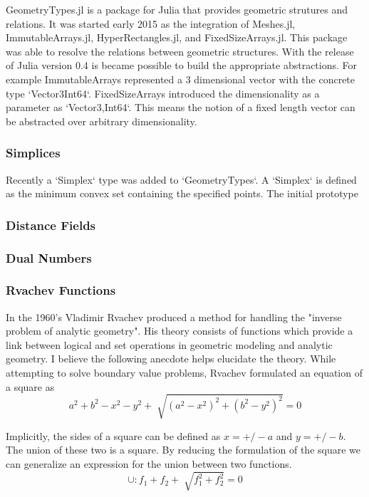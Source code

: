 \documentclass[a4paper]{article}
\begin{document}
GeometryTypes.jl is a package for Julia that provides geometric strutures and
relations. It was started early 2015 as the integration of Meshes.jl,
ImmutableArrays.jl, HyperRectangles.jl, and FixedSizeArrays.jl. This package
was able to resolve the relations between geometric structures. With the
release of Julia version 0.4 is became possible to build the appropriate
abstractions. For example ImmutableArrays represented a 3 dimensional
vector with the concrete type `Vector3{Int64}`. FixedSizeArrays introduced
the dimensionality as a parameter as `Vector{3,Int64}`. This means the notion
of a fixed length vector can be abstracted over arbitrary dimensionality.

\subsubsection{Simplices}

Recently a `Simplex` type was added to `GeometryTypes`. A `Simplex` is defined
as the minimum convex set containing the specified points. The initial
prototype


\subsubsection{Distance Fields}



\subsubsection{Dual Numbers}


\subsubsection{Rvachev Functions}


In the 1960's Vladimir Rvachev produced a method for handling the "inverse
problem of analytic geometry". His theory consists of functions which provide a
link between logical and set operations in geometric modeling and analytic
geometry.\cite{shapiro1991theory} I believe the following anecdote helps
elucidate the theory. While attempting to solve boundary value problems,
Rvachev formulated an equation of a square as
\begin{equation*}
a^2 + b^2 − x^2 − y^2 + \sqrt[]{( a^2 − x^2 )^2 +( b^2 − y^2 )^2} =0
\end{equation*}

Implicitly, the sides of a square can be defined as $x= +/- a$ and $y= +/- b$.
The union of these two is a square. By reducing the formulation of the square
we can generalize an expression for the union between two functions.
\begin{equation*}
\cup : f_1 + f_2 + \sqrt[]{f_1^2 +f_2^2} =0
\end{equation*}
\end{document}
